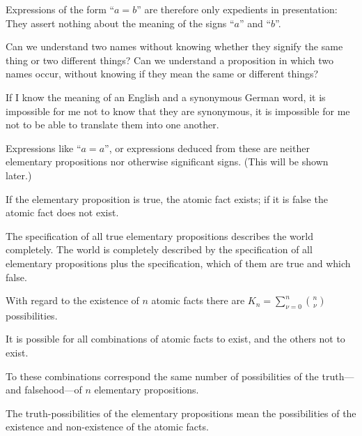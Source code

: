 {Expressions of the form ``$a = b$'' are therefore only
expedients in presentation: They assert nothing
about the meaning of the signs ``$a$'' and ``$b$''.}


{Can we understand two names without knowing
whether they signify the same thing or two
different things? Can we understand a proposition
in which two names occur, without knowing if they
mean the same or different things?

If I know the meaning of an English and a
synonymous German word, it is impossible for
me not to know that they are synonymous, it is
impossible for me not to be able to translate them
into one another.

Expressions like ``$a = a$'', or expressions
deduced from these are neither elementary propositions
nor otherwise significant signs. (This
will be shown later.)}


{If the elementary proposition is true, the atomic
fact exists; if it is false the atomic fact does not
exist.}


{The specification of all true elementary propositions
describes the world completely. The
world is completely described by the specification
of all elementary propositions plus the specification,
which of them are true and which false.}


{With regard to the existence of $n$ atomic facts
there are $K_{n} = \sum\limits_{\nu = 0}^n\binom{n}{\nu}$ possibilities.

It is possible for all combinations of atomic
facts to exist, and the others not to exist.}


{To these combinations correspond the same
number of possibilities of the truth---and falsehood---of
$n$ elementary propositions.}


{The truth-possibilities of the elementary propositions
mean the possibilities of the existence
and non-existence of the atomic facts.}


